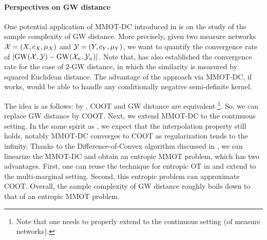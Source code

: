 
\paragraph{Perspectives on GW distance} One potential application of MMOT-DC introduced
in  is on the study of the sample complexity of GW distance.
More precisely, given two measure networks $\mathcal X = (X, c_X, \mu_X)$ and $\mathcal Y = (Y, c_Y, \mu_Y)$,
we want to quantify the convergence rate of $|\text{GW}(\mathcal X, \mathcal Y) - \text{GW}(\mathcal X_n, \mathcal Y_n)|$.
Note that, \citep{Zhang23} has also established the convergence rate for the case of $2$-GW distance,
in which the similarity is measured by squared Euclidean distance.
The advantage of the approach via MMOT-DC, if works, would be able to handle any
conditionally negative semi-definite kernel.

The idea is as follows: by ,
COOT and GW distance are equivalent
\footnote{Note that one needs to properly extend  to the continuous setting
(of measure networks).}. So, we can replace GW distance by COOT.
Next, we extend MMOT-DC to the continuous setting. In the same spirit as ,
we expect that the interpolation property still holds,
notably MMOT-DC converges to COOT as regularization tends to the infinity.
Thanks to the Difference-of-Convex algorithm discussed in ,
we can linearize the MMOT-DC and obtain an entropic MMOT problem, which has two advantages.
First, one can reuse the technique for entropic OT in \citep{Genevay19}
and extend to the multi-marginal setting. Second, this entropic problem can approximate COOT.
Overall, the sample complexity of GW distance roughly boils down to that of an entropic MMOT problem.

